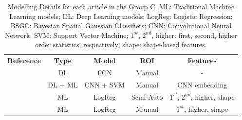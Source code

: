 \documentclass{article}
\begin{document}
\begin{table}[]
    \centering
    \begin{tabular}{ccccc}\toprule
        \multirow{2}{*}{\textbf{Reference}} & \multirow{2}{*}{\textbf{Type}} & \multirow{2}{*}{\textbf{Model}} & \multirow{2}{*}{\textbf{ROI}} & \multirow{2}{*}{\textbf{Features}} \\
        \\ \midrule
        \cite{Bi2017}                       & DL                             & FCN                             & Manual                        & -                                  \\
        \cite{Bi2022}                       & DL + ML                        & CNN + SVM                       & Manual                        & CNN embedding                      \\
        \cite{Kong2022}                     & ML                             & LogReg                          & Semi-Auto                     & $1^{st}$, $2^{nd}$, higher, shape  \\
        \cite{Zheng2020}                    & ML                             & LogReg                          & Manual                        & $1^{st}$, higher, shape            \\
        \bottomrule
    \end{tabular}
    \caption{Modelling Details for each article in the Group C. ML: Traditional Machine Learning models; DL: Deep Learning models; LogReg: Logistic Regression;
        BSGC: Bayesian Spatial Gaussian Classifiers; CNN: Convolutional Neural Network; SVM: Support Vector Machine;
        $1^{st}$, $2^{nd}$, higher: first, second, higher order statistics, respectively; shape: shape-based features.}
    \label{tab:model_C}
\end{table}
\end{document}

